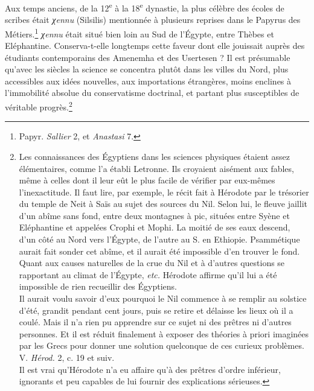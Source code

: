 \documentclass[a4paper, 11pt, oneside]{article}
\begin{document}
Aux temps anciens, de la 12\textsuperscript{e} à la 18\textsuperscript{e} dynastie, la plus célèbre des écoles de scribes était \emph{χennu} (Silsilis) mentionnée à plusieurs reprises dans le Papyrus des Métiers.\footnote{Papyr. \emph{Sallier} 2, et \emph{Anastasi} 7.} \emph{χennu} était situé bien loin au Sud de l'Égypte, entre Thèbes et Eléphantine. Conserva-t-elle longtemps cette faveur dont elle jouissait auprès des étudiants contemporains des Amenemha et des Usertesen ? Il est présumable qu'avec les siècles la science se concentra plutôt dans les villes du Nord, plus accessibles aux idées nouvelles, aux importations étrangères, moins enclines à l'immobilité absolue du conservatisme doctrinal, et partant plus susceptibles de véritable progrès.\footnote{Les connaissances des Égyptiens dans les sciences physiques étaient assez élémentaires, comme l'a établi Letronne. Ils croyaient aisément aux fables, même à celles dont il leur eût le plus facile de vérifier par eux-mêmes l'inexactitude. Il faut lire, par exemple, le récit fait à Hérodote par le trésorier du temple de Neit à Saïs au sujet des sources du Nil. Selon lui, le fleuve jaillit d'un abîme sans fond, entre deux montagnes à pic, situées entre Syène et Eléphantine et appelées Crophi et Mophi. La moitié de ses eaux descend, d'un côté au Nord vers l'Égypte, de l'autre au S. en Ethiopie. Psammétique aurait fait sonder cet abîme, et il aurait été impossible d'en trouver le fond. Quant aux causes naturelles de la crue du Nil et à d'autres questions se rapportant au climat de l'Égypte, \emph{etc.} Hérodote affirme qu'il lui a été impossible de rien recueillir des Égyptiens.\\\hspace*{5mm}Il aurait voulu savoir d'eux pourquoi le Nil commence à se remplir au solstice d'été, grandit pendant cent jours, puis se retire et délaisse les lieux où il a coulé. Mais il n'a rien pu apprendre sur ce sujet ni des prêtres ni d'autres personnes. Et il est réduit finalement à exposer des théories à priori imaginées par les Grecs pour donner une solution quelconque de ces curieux problèmes. V. \emph{Hérod.} 2, c. 19 et suiv.\\\hspace*{5mm}Il est vrai qu'Hérodote n'a eu affaire qu'à des prêtres d'ordre inférieur, ignorants et peu capables de lui fournir des explications sérieuses.}
\end{document}
